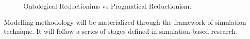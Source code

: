 \documentclass[11pt,oneside,a4paper,openright]{report}
\begin{document}
\begin{figure}[h]
\centering
\setlength\fboxsep{0pt}
\setlength\fboxrule{0.5pt}
\caption{Ontological Reductionims vs Pragmatical Reductionism.}
\label{fig:Equifinality}
\end{figure}


Modelling methodology will be materialized through the framework of simulation technique. It will follow a series
of stages defined in simulation-based research. 
\end{document}
